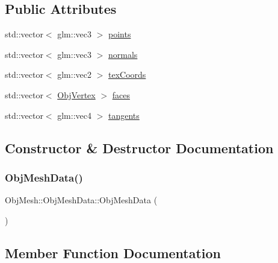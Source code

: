 \subsection*{Public Attributes}
\begin{DoxyCompactItemize}
\item 
std\+::vector$<$ glm\+::vec3 $>$ \mbox{\hyperlink{class_obj_mesh_1_1_obj_mesh_data_a4c1f99780ac40b800bb9a5d7c7ca9a23}{points}}
\item 
std\+::vector$<$ glm\+::vec3 $>$ \mbox{\hyperlink{class_obj_mesh_1_1_obj_mesh_data_a284ccc661b640d645b7eb26c2499253c}{normals}}
\item 
std\+::vector$<$ glm\+::vec2 $>$ \mbox{\hyperlink{class_obj_mesh_1_1_obj_mesh_data_a0784aa856fa9f3b40aca429ca3f76efc}{tex\+Coords}}
\item 
std\+::vector$<$ \mbox{\hyperlink{class_obj_mesh_1_1_obj_mesh_data_1_1_obj_vertex}{Obj\+Vertex}} $>$ \mbox{\hyperlink{class_obj_mesh_1_1_obj_mesh_data_ad1d61b4a4dbaccf79bb63292438187fe}{faces}}
\item 
std\+::vector$<$ glm\+::vec4 $>$ \mbox{\hyperlink{class_obj_mesh_1_1_obj_mesh_data_a171c230b9c3b0317aa9c3c69a3335d20}{tangents}}
\end{DoxyCompactItemize}


\subsection{Constructor \& Destructor Documentation}
\mbox{\label{class_obj_mesh_1_1_obj_mesh_data_a60cd7ccf455f36bc44e50be50f036fe7}} 
\subsubsection{\texorpdfstring{ObjMeshData()}{ObjMeshData()}}
{\footnotesize\ttfamily Obj\+Mesh\+::\+Obj\+Mesh\+Data\+::\+Obj\+Mesh\+Data (\begin{DoxyParamCaption}{ }\end{DoxyParamCaption})\hspace{0.3cm}{\ttfamily [inline]}}



\subsection{Member Function Documentation}
\mbox{\label{class_obj_mesh_1_1_obj_mesh_data_a0a43c495dbb859e42a5d9331835f0e23}} 
